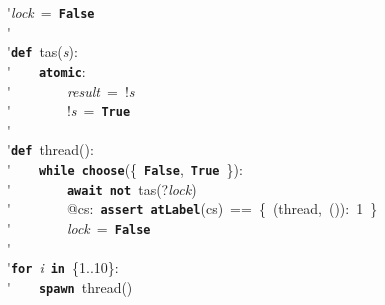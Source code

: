 \'\>\textit{lock}~=~\texttt{\textbf{False}}\\

\'\>\\

\'\>\texttt{\textbf{def}}~tas(\textit{s}):\\

\'\>~~~~\texttt{\textbf{atomic}}:\\

\'\>~~~~~~~~\textit{result}~=~!\textit{s}\\

\'\>~~~~~~~~!\textit{s}~=~\texttt{\textbf{True}}\\

\'\>~~~~\\

\'\>\texttt{\textbf{def}}~thread():\\

\'\>~~~~\texttt{\textbf{while}}~\texttt{\textbf{choose}}(\{~\texttt{\textbf{False}},~\texttt{\textbf{True}}~\}):\\

\'\>~~~~~~~~\texttt{\textbf{await}}~\texttt{\textbf{not}}~tas(?\textit{lock})\\

\'\>~~~~~~~~@cs:~\texttt{\textbf{assert}}~\texttt{\textbf{atLabel}}(cs)~==~\{~(thread,~()):~1~\}\\

\'\>~~~~~~~~\textit{lock}~=~\texttt{\textbf{False}}\\

\'\>~~~~\\

\'\>\texttt{\textbf{for}}~\textit{i}~\texttt{\textbf{in}}~\{1..10\}:\\

\'\>~~~~\texttt{\textbf{spawn}}~thread()